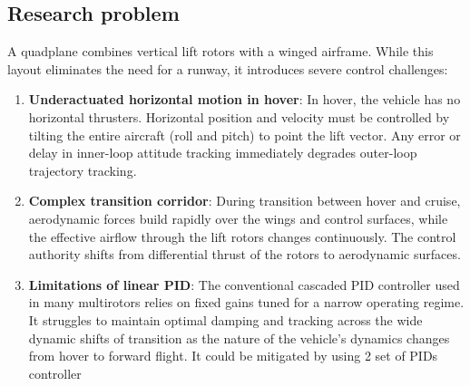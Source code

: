 \documentclass{article}
\begin{document}
\subsection{Research problem}
\label{sec:research-problem}
A quadplane combines vertical lift rotors with a winged airframe. While this layout eliminates the need for a runway, it introduces severe control challenges:
\begin{enumerate}
    \item \textbf{Underactuated horizontal motion in hover}: In hover, the vehicle has no horizontal thrusters. Horizontal position and velocity must be controlled by tilting the entire aircraft (roll and pitch) to point the lift vector. Any error or delay in inner-loop attitude tracking immediately degrades outer-loop trajectory tracking.
    \item \textbf{Complex transition corridor}: During transition between hover and cruise, aerodynamic forces build rapidly over the wings and control surfaces, while the effective airflow through the lift rotors changes continuously. The control authority shifts from differential thrust of the rotors to aerodynamic surfaces.
    \item \textbf{Limitations of linear PID}: The conventional cascaded PID controller used in many multirotors relies on fixed gains tuned for a narrow operating regime. It struggles to maintain optimal damping and tracking across the wide dynamic shifts of transition as the nature of the vehicle's dynamics changes from hover to forward flight. It could be mitigated by using 2 set of PIDs controller
\end{enumerate}
\end{document}
